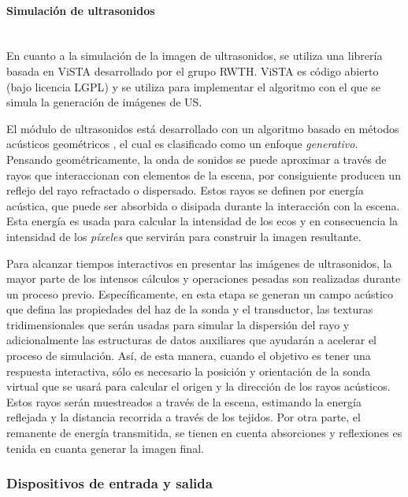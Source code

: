 \paragraph{Simulación de ultrasonidos} \mbox{}\\

En cuanto a la simulación de la imagen de ultrasonidos, se utiliza una librería basada en \ac{ViSTA} desarrollado por el grupo \ac{RWTH}. \ac{ViSTA} es código abierto (bajo licencia \ac{LGPL}) y se utiliza para implementar el algoritmo con el que se simula la generación de imágenes de \ac{US}.

El módulo de ultrasonidos está desarrollado con un algoritmo basado en métodos acústicos geométricos \cite{Law2015}, el cual es clasificado como un enfoque \emph{generativo}. Pensando geométricamente, la onda de sonidos se puede aproximar a través de rayos que interaccionan con elementos de la escena, por consiguiente producen un reflejo del rayo refractado o dispersado. Estos rayos se definen por energía acústica, que puede ser absorbida o disipada durante la interacción con la escena. Esta energía es usada para calcular la intensidad de los ecos y en consecuencia la intensidad de los \emph{píxeles} que servirán para construir la imagen resultante.

Para alcanzar tiempos interactivos en presentar las imágenes de ultrasonidos, la mayor parte de los intensos cálculos y operaciones pesadas son realizadas durante un proceso previo. Específicamente, en esta etapa se generan un campo acústico que defina las propiedades del haz de la sonda y el transductor, las texturas tridimensionales que serán usadas para simular la dispersión del rayo y adicionalmente las estructuras de datos auxiliares que ayudarán a acelerar el proceso de simulación.
Así, de esta manera, cuando el objetivo es tener una respuesta interactiva, sólo es necesario la posición y orientación de la sonda virtual que se usará para calcular el origen y la dirección de los rayos acústicos. Estos rayos serán muestreados a través de la escena, estimando la energía reflejada y la distancia recorrida a través de los tejidos. Por otra parte, el remanente de energía transmitida, se tienen en cuenta absorciones y reflexiones es tenida en cuanta generar la imagen final.

\subsubsection{Dispositivos de entrada y salida}

